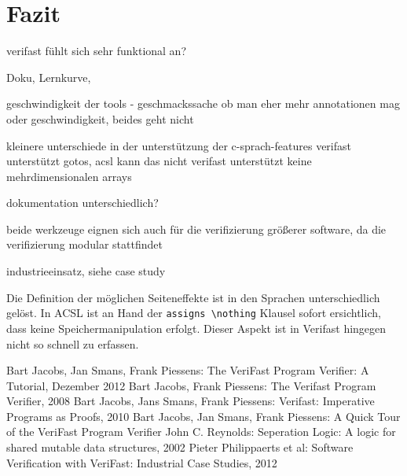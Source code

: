 ﻿\chapter{Fazit}

verifast fühlt sich sehr funktional an?

Doku, Lernkurve, 

geschwindigkeit der tools - geschmackssache ob man eher mehr annotationen mag oder geschwindigkeit, beides geht nicht


kleinere unterschiede in der unterstützung der c-sprach-features
	verifast unterstützt gotos, acsl kann das nicht
	verifast unterstützt keine mehrdimensionalen arrays
	
dokumentation unterschiedlich?
	
beide werkzeuge eignen sich auch für die verifizierung größerer software, da die verifizierung modular stattfindet

industrieeinsatz, siehe case study

Die Definition der möglichen Seiteneffekte ist in den Sprachen unterschiedlich gelöst. In ACSL
ist an Hand der \lstinline{assigns \nothing} Klausel sofort ersichtlich, dass keine Speichermanipulation
erfolgt. Dieser Aspekt ist in Verifast hingegen nicht so schnell zu erfassen.

\begin{thebibliography}{}
 Bart Jacobs, Jan Smans, Frank Piessens: The VeriFast Program Verifier: A Tutorial, Dezember 2012
 Bart Jacobs, Frank Piessens: The Verifast Program Verifier, 2008
 Bart Jacobs, Jans Smans, Frank Piessens: Verifast: Imperative Programs as Proofs, 2010
 Bart Jacobs, Jan Smans, Frank Piessens: A Quick Tour of the VeriFast Program Verifier
 John C. Reynolds: Seperation Logic: A logic for shared mutable data structures, 2002
 Pieter Philippaerts et al: Software Verification with VeriFast: Industrial Case Studies, 2012
\end{thebibliography}
